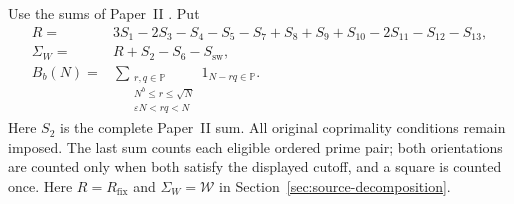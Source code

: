 Use the sums of Paper~II \cite[(1.7)--(1.11)]{PaperII}.
Put
\begin{equation}\label{eq:intro-source}
\begin{aligned}
 R={}&3S_1-2S_3-S_4-S_5-S_7+S_8+S_9+S_{10}
              -2S_{11}-S_{12}-S_{13},\\
 \Sigma_W={}&R+S_2-S_6-S_{\mathrm{sw}},\\
 B_b(N)={}&\sum_{\substack{r,q\in\mathbb P\\
              N^b\le r\le\sqrt N\\\varepsilon N<rq<N}}
                       1_{N-rq\in\mathbb P}.
\end{aligned}
\end{equation}
Here $S_2$ is the complete Paper~II sum.
All original coprimality conditions remain imposed.
The last sum counts each eligible ordered prime pair; both orientations are counted only when both satisfy the displayed cutoff, and a square is counted once.
Here $R=R_{\mathrm{fix}}$ and $\Sigma_W=\mathcal W$
in Section~\ref{sec:source-decomposition}.

